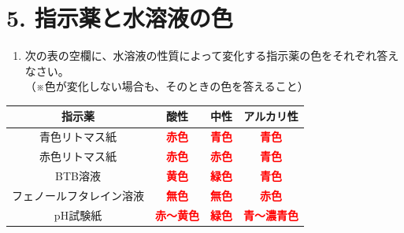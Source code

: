 \section*{5. 指示薬と水溶液の色}
\begin{enumerate}
    \item 次の表の空欄に、水溶液の性質によって変化する指示薬の色をそれぞれ答えなさい。\\
    （※色が変化しない場合も、そのときの色を答えること）
\end{enumerate}
\begin{center}
\renewcommand{\arraystretch}{1.8}
\begin{tabular}{|c|c|c|c|}
\hline
指示薬 & 酸性 & 中性 & アルカリ性 \\ \hline
青色リトマス紙 & \textcolor{red}{\textbf{赤色}} & \textcolor{red}{\textbf{青色}} & \textcolor{red}{\textbf{青色}} \\ \hline
赤色リトマス紙 & \textcolor{red}{\textbf{赤色}} & \textcolor{red}{\textbf{赤色}} & \textcolor{red}{\textbf{青色}} \\ \hline
BTB溶液 & \textcolor{red}{\textbf{黄色}} & \textcolor{red}{\textbf{緑色}} & \textcolor{red}{\textbf{青色}} \\ \hline
フェノールフタレイン溶液 & \textcolor{red}{\textbf{無色}} & \textcolor{red}{\textbf{無色}} & \textcolor{red}{\textbf{赤色}} \\ \hline
pH試験紙 & \textcolor{red}{\textbf{赤～黄色}} & \textcolor{red}{\textbf{緑色}} & \textcolor{red}{\textbf{青～濃青色}} \\ \hline
\end{tabular}
\end{center}
